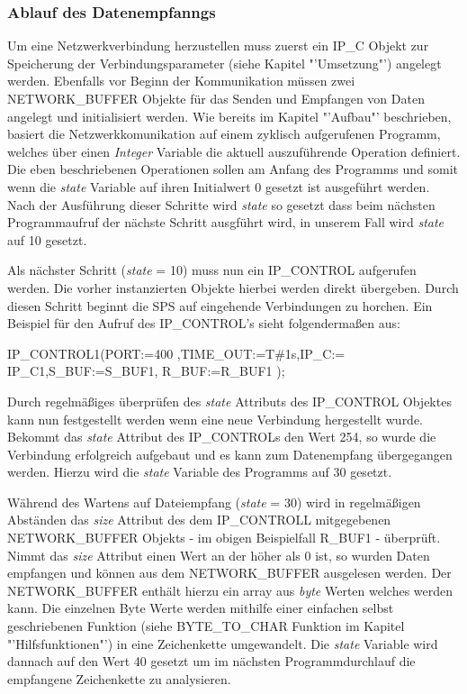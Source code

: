 \subsubsection{Ablauf des Datenempfanngs}

Um eine Netzwerkverbindung herzustellen muss zuerst ein IP\_C Objekt zur Speicherung der Verbindungsparameter (siehe Kapitel "'Umsetzung"') angelegt werden.
Ebenfalls vor Beginn der Kommunikation müssen zwei NETWORK\_BUFFER Objekte für das Senden und Empfangen von Daten angelegt und initialisiert werden. 
Wie bereits im Kapitel "'Aufbau"' beschrieben, basiert die Netzwerkkomunikation auf einem zyklisch aufgerufenen Programm, welches über einen \textit{Integer} Variable die aktuell auszuführende Operation definiert. Die eben beschriebenen Operationen sollen am Anfang des Programms und somit wenn die \textit {state} Variable auf ihren Initialwert 0 gesetzt ist ausgeführt werden. Nach der Ausführung dieser Schritte wird \textit {state} so gesetzt dass beim nächsten Programmaufruf der nächste Schritt ausgführt wird, in unserem Fall wird \textit{state} auf 10 gesetzt.

Als nächster Schritt (\textit{state} = 10) muss nun ein  IP\_CONTROL aufgerufen werden. Die vorher instanzierten Objekte hierbei werden direkt übergeben. Durch diesen Schritt beginnt die SPS auf eingehende Verbindungen zu horchen.
Ein Beispiel für den Aufruf des IP\_CONTROL's sieht folgendermaßen aus:

IP\_CONTROL1(PORT:=400 ,TIME\_OUT:=T\#1s,IP\_C:= IP\_C1,S\_BUF:=S\_BUF1, R\_BUF:=R\_BUF1 );

Durch regelmäßiges überprüfen des \textit{state} Attributs des IP\_CONTROL Objektes kann nun festgestellt werden wenn eine neue Verbindung hergestellt wurde. Bekommt das \textit{state} Attribut des IP\_CONTROLs den Wert 254, so wurde die Verbindung erfolgreich aufgebaut und es kann zum Datenempfang übergegangen werden. Hierzu wird die \textit{state} Variable des Programms auf 30 gesetzt.

Während des Wartens auf Dateiempfang (\textit{state} = 30) wird in regelmäßigen Abständen das \textit{size} Attribut des dem IP\_CONTROLL mitgegebenen NETWORK\_BUFFER Objekts - im obigen Beispielfall R\_BUF1 - überprüft. Nimmt das \textit{size} Attribut einen Wert an der höher als 0 ist, so wurden Daten empfangen und können aus dem NETWORK\_BUFFER ausgelesen werden. Der NETWORK\_BUFFER enthält hierzu ein array aus \textit{byte} Werten welches werden kann. Die einzelnen Byte Werte werden mithilfe einer einfachen selbst geschriebenen Funktion (siehe BYTE\_TO\_CHAR Funktion im Kapitel "'Hilfsfunktionen"') in eine Zeichenkette umgewandelt. Die \textit{state} Variable wird dannach auf den Wert 40 gesetzt um im nächsten Programmdurchlauf die empfangene Zeichenkette zu analysieren.

